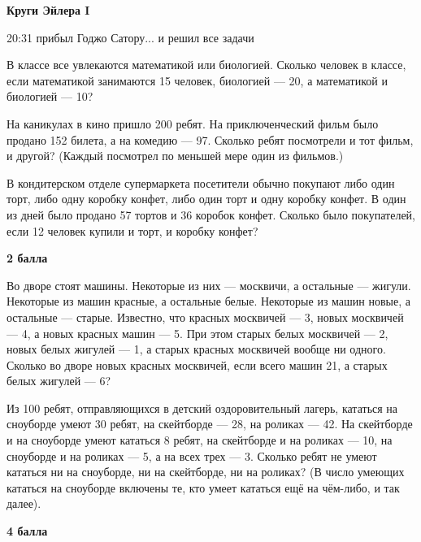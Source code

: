 \centerline{\bf \Huge Круги Эйлера I}


\begin{flushright}
        \scriptsize{20:31 прибыл Годжо Сатору... и решил все задачи}
\end{flushright}

 В классе все увлекаются математикой или биологией. Сколько
человек в классе, если математикой занимаются 15 человек, биологией — 20, а математикой
и биологией — 10?


 На каникулах в кино пришло 200 ребят. На приключенческий фильм было продано 152 билета, а на комедию — 97.
Сколько ребят посмотрели и тот фильм, и другой? (Каждый посмотрел по меньшей мере один из фильмов.)


 В кондитерском отделе супермаркета посетители обычно покупают либо один торт, либо одну коробку конфет, либо один торт и одну коробку конфет. В один из дней было продано 57 тортов и 36 коробок конфет. Сколько было покупателей, если 12 человек купили и торт, и коробку конфет?

\begin{flushright} \textbf{2 балла}\\ 
\end{flushright}

 Во дворе стоят машины. Некоторые из них — москвичи, а остальные — жигули. Некоторые из машин красные, а остальные белые. Некоторые из машин новые, а остальные — старые. Известно, что красных москвичей — 3, новых москвичей — 4, а новых красных машин — 5. При этом старых белых москвичей — 2, новых белых жигулей — 1, а старых красных москвичей вообще ни одного. Сколько во дворе новых красных москвичей, если всего машин 21, а старых белых жигулей — 6?

 Из 100 ребят, отправляющихся в детский оздоровительный лагерь, кататься на сноуборде умеют 30 ребят, на скейтборде — 28, на роликах — 42. На скейтборде и на сноуборде умеют кататься 8 ребят, на скейтборде и на роликах — 10, на сноуборде и на роликах — 5, а на всех трех — 3. Сколько ребят не умеют кататься ни на сноуборде, ни на скейтборде, ни на роликах? (В число умеющих кататься на сноуборде включены те, кто умеет кататься ещё на чём-либо, и так далее).

\begin{flushright} \textbf{4 балла}\\ 
\end{flushright}

